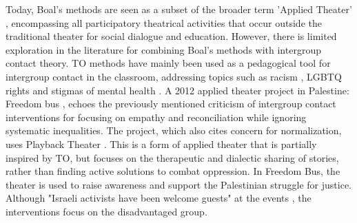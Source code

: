 \documentclass[dissertation,math,vertlayout,pdfa,colorlinks,nologo]{aaltoseries}
\begin{document}
Today, Boal's methods are seen as a subset of the broader term 'Applied Theater' \cite{gjaerumAppliedTheatreResearch2013}, encompassing all participatory theatrical activities that occur outside the traditional theater for social dialogue and education. However, there is limited exploration in the literature for combining Boal's methods with intergroup contact theory. TO methods have mainly been used as a pedagogical tool for intergroup contact in the classroom, addressing topics such as racism \cite{abramsPrejudiceReductionCollective2012}, LGBTQ rights \cite{abramsPrejudiceReductionCollective2012,garciaOppressionPedagogyIntergroup2019} and stigmas of mental health \cite{nordstromVoicesProjectUsing2021}. A 2012 applied theater project in Palestine: Freedom bus \cite{riversNarrativePowerPlayback2015}, echoes the previously mentioned criticism of intergroup contact interventions for focusing on empathy and reconciliation while ignoring systematic inequalities. The project, which also cites concern for normalization, uses Playback Theater \cite{sajnaniOpeningPlaybackTheatre2011}. This is a form of applied theater that is partially inspired by TO, but focuses on the therapeutic and dialectic sharing of stories, rather than finding active solutions to combat oppression. In Freedom Bus, the theater is used to raise awareness and support the Palestinian struggle for justice. Although "Israeli activists have been welcome guests" at the events \cite[p. 159]{riversNarrativePowerPlayback2015}, the interventions focus on the disadvantaged group. 
\end{document}
